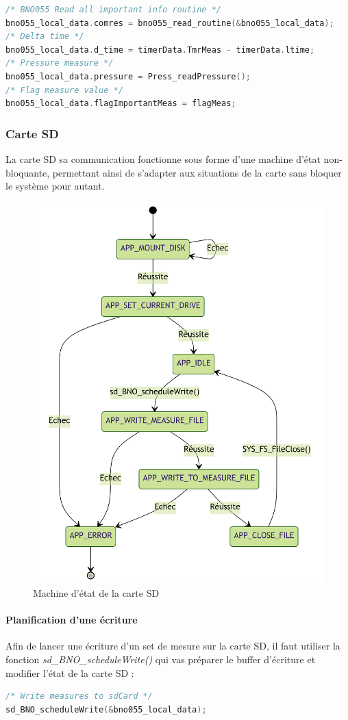 {	\begin{lstlisting}[frame=single, language=C, caption={Code lecture des données par la librairie}, captionpos=b, breaklines=true]
/* BNO055 Read all important info routine */
bno055_local_data.comres = bno055_read_routine(&bno055_local_data);
/* Delta time */
bno055_local_data.d_time = timerData.TmrMeas - timerData.ltime;
/* Pressure measure */
bno055_local_data.pressure = Press_readPressure();
/* Flag measure value */
bno055_local_data.flagImportantMeas = flagMeas;
	\end{lstlisting}

	\subsubsection{Carte SD}
	La carte SD sa communication fonctionne sous forme d'une machine d'état non-bloquante, permettant ainsi de s'adapter aux situations de la carte sans bloquer le système pour autant.
	
	\begin{figure}[h]
		\centering
		\includegraphics[width=0.6\linewidth]{Figures/Dev-SOFT/mermaid-diagram-2023-06-14-162436}
		\caption{Machine d'état de la carte SD}
		\label{fig:mermaid-diagram-2023-06-14-162436}
	\end{figure}

	\clearpage
	
	\paragraph{Planification d'une écriture}
	Afin de lancer une écriture d'un set de mesure sur la carte SD, il faut utiliser la fonction \textit{sd\_BNO\_scheduleWrite()} qui vas préparer le buffer d'écriture et modifier l'état de la carte SD : 
	\begin{lstlisting}[frame=single, language=C, caption={Lancement d'une écriture sur la carte SD}, captionpos=b, breaklines=true]
/* Write measures to sdCard */
sd_BNO_scheduleWrite(&bno055_local_data);
	\end{lstlisting}
	
}

